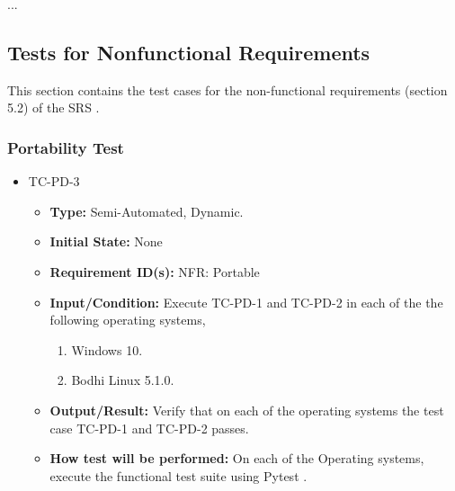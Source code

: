 \documentclass[12pt, titlepage]{article}
\begin{document}
...
\subsection{Tests for Nonfunctional Requirements}


This section contains the test cases for the non-functional requirements (section
5.2) of the SRS \cite{SRS}.


\subsubsection{Portability Test}

\begin{itemize}
\item{TC-PD-3\\}
\begin{itemize}

\item{\textbf{Type:}} Semi-Automated, Dynamic.
					
\item{\textbf{Initial State:}} None

\item{\textbf{Requirement ID(s):}} NFR: Portable
					
\item{\textbf{Input/Condition:}}  Execute TC-PD-1 and TC-PD-2 in each of the the following 
operating systems,

\begin{enumerate}
\item Windows 10.
\item Bodhi Linux 5.1.0. 
\end {enumerate}
					
\item{\textbf{Output/Result:}} Verify that on each of the operating systems the test 
case TC-PD-1 and TC-PD-2 passes. 

\item{\textbf{How test will be performed:}}  On each of the Operating systems,
execute the functional test suite using  Pytest \cite{Pytest}. 

\end{itemize}
\end{itemize}
\end{document}

